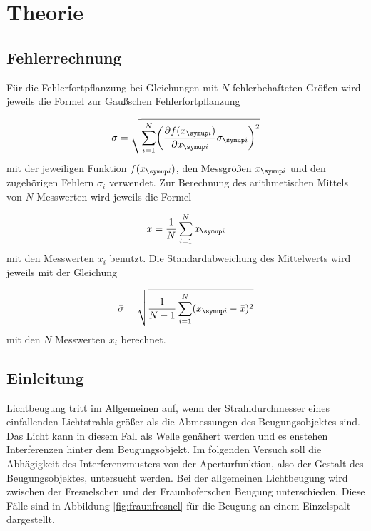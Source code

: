 \section{Theorie}
\label{sec:Theorie}

\subsection{Fehlerrechnung}

Für die Fehlerfortpflanzung bei Gleichungen mit $N$ fehlerbehafteten Größen
wird jeweils die Formel zur Gaußschen Fehlerfortpflanzung

\begin{equation*}
  \sigma = \sqrt{\sum_{i=1}^{N}\biggl(\frac{\partial f(x_{\g{i}})}{\partial x_{\g{i}}}
  \sigma_{\g{i}}\biggr)^2}
\end{equation*}
mit der jeweiligen Funktion $f(x_{\g{i}})$, den Messgrößen $x_{\g{i}}$ und den
zugehörigen Fehlern $\sigma_i$ verwendet.
Zur Berechnung des arithmetischen Mittels von $N$ Messwerten wird jeweils die
Formel

\begin{equation*}
  \bar{x} = \frac{1}{N}\sum_{i=1}^{N}x_{\g{i}}
\end{equation*}
mit den Messwerten $x_i$ benutzt.
Die Standardabweichung des Mittelwerts wird jeweils mit der Gleichung

\begin{equation*}
  \bar{\sigma} = \sqrt{\frac{1}{N-1}\sum_{i=1}^{N}(x_{\g{i}} - \bar{x})^2}
\end{equation*}
mit den $N$ Messwerten $x_i$ berechnet.

\subsection{Einleitung}

Lichtbeugung tritt im Allgemeinen auf, wenn der Strahldurchmesser eines
einfallenden Lichtstrahls größer als die Abmessungen des Beugungsobjektes sind.
Das Licht kann in diesem Fall als Welle genähert werden und es enstehen
Interferenzen hinter dem Beugungsobjekt.
Im folgenden Versuch soll die Abhägigkeit des Interferenzmusters von der
Aperturfunktion, also der Gestalt des Beugungsobjektes, untersucht werden.
Bei der allgemeinen Lichtbeugung wird zwischen der Fresnelschen und der
Fraunhoferschen Beugung unterschieden. Diese Fälle sind in Abbildung
\ref{fig:fraunfresnel} für die Beugung an einem Einzelspalt dargestellt.

